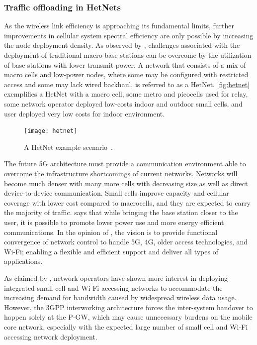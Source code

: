 \subsubsection{Traffic offloading in \acsp{HetNet}}
\label{subsec:heterogeneous}

As the wireless link efficiency is approaching its fundamental limits, further
improvements in cellular system spectral efficiency are only possible by
increasing the node deployment density. As observed by \citet{Damnjanovic2011},
challenges associated with the deployment of traditional macro base stations
can be overcome by the utilization of base stations with lower transmit power.
A network that consists of a mix of macro cells and low-power nodes, where some
may be configured with restricted access and some may lack wired backhaul, is
referred to as a \acf{HetNet}. \autoref{fig:hetnet} exemplifies a \ac{HetNet}
with a macro cell, some metro and picocells used for relay, some network
operator deployed low-costs indoor and outdoor small cells, and user deployed
very low costs for indoor environment.

\begin{figure}[htb]
  \centering
  \texttt{[image: hetnet]}
  \caption{A \acs{HetNet} example scenario~\cite{Qualcomm2014}.}
  \label{fig:hetnet}
\end{figure}

The future 5G architecture must provide a communication environment able to
overcome the infrastructure shortcomings of current networks. Networks will
become much denser with many more cells with decreasing size as well as direct
device-to-device communication. Small cells improve capacity and cellular
coverage with lower cost compared to macrocells, and they are expected to carry
the majority of traffic. \citet{Pierucci2015} says that while bringing the base
station closer to the user, it is possible to promote lower power use and more
energy efficient communications. In the opinion of \citet{Einsiedler2015}, the
vision is to provide functional convergence of network control to handle 5G,
4G, older access technologies, and Wi-Fi; enabling a flexible and efficient
support and deliver all types of applications.

As claimed by \citet{Tomici2015}, network operators have shown more interest in
deploying integrated small cell and Wi-Fi accessing networks to accommodate the
increasing demand for bandwidth caused by widespread wireless data usage.
However, the 3GPP interworking architecture forces the inter-system handover to
happen solely at the \ac{P-GW}, which may cause unnecessary burdens on the
mobile core network, especially with the expected large number of small cell
and Wi-Fi accessing network deployment.

